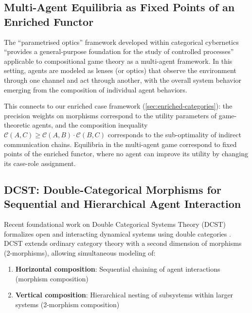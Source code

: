\documentclass[
]{article}
\providecommand{\tightlist}{%
  \setlength{\itemsep}{0pt}\setlength{\parskip}{0pt}}
\begin{document}
\subsection{Multi-Agent Equilibria as Fixed Points of an Enriched
Functor}\label{multi-agent-equilibria-as-fixed-points-of-an-enriched-functor}

The ``parametrised optics'' framework developed within categorical
cybernetics ``provides a general-purpose foundation for the study of
controlled processes'' \citep{capucci2021towards} applicable to
compositional game theory as a multi-agent framework. In this setting,
agents are modeled as lenses (or optics) that observe the environment
through one channel and act through another, with the overall system
behavior emerging from the composition of individual agent behaviors.

This connects to our enriched case framework
(\autoref{sec:enriched-categories}): the precision weights on morphisms
correspond to the utility parameters of game-theoretic agents, and the
composition inequality
\(\mathcal{C}(A,C) \geq \mathcal{C}(A,B) \cdot \mathcal{C}(B,C)\)
corresponds to the sub-optimality of indirect communication chains.
Equilibria in the multi-agent game correspond to fixed points of the
enriched functor, where no agent can improve its utility by changing its
case-role assignment.

\subsection{DCST: Double-Categorical Morphisms for Sequential and
Hierarchical Agent
Interaction}\label{dcst-double-categorical-morphisms-for-sequential-and-hierarchical-agent-interaction}

Recent foundational work on Double Categorical Systems Theory (DCST)
formalizes open and interacting dynamical systems using double
categories \citep{myers2023double}. DCST extends ordinary category
theory with a second dimension of morphisms (2-morphisms), allowing
simultaneous modeling of:

\begin{enumerate}
\def\labelenumi{\arabic{enumi}.}
\tightlist
\item
  \textbf{Horizontal composition}: Sequential chaining of agent
  interactions (morphism composition)
\item
  \textbf{Vertical composition}: Hierarchical nesting of subsystems
  within larger systems (2-morphism composition)
\end{enumerate}
\end{document}
